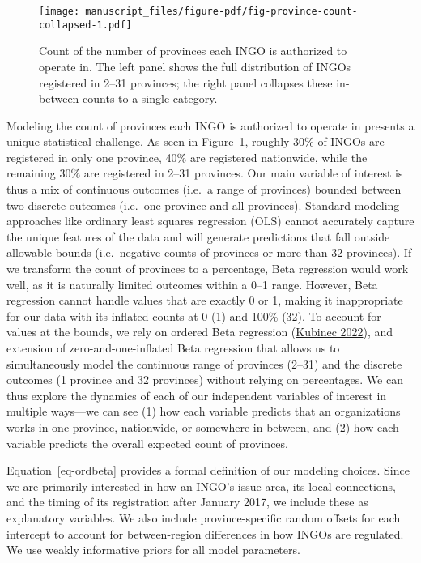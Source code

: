 \documentclass[
]{article}
\begin{document}
\begin{figure}

{\centering \texttt{[image: manuscript\_files/figure-pdf/fig-province-count-collapsed-1.pdf]}

}

\caption{\label{fig-province-count-collapsed}Count of the number of
provinces each INGO is authorized to operate in. The left panel shows
the full distribution of INGOs registered in 2--31 provinces; the right
panel collapses these in-between counts to a single category.}

\end{figure}

Modeling the count of provinces each INGO is authorized to operate in
presents a unique statistical challenge. As seen in
Figure~\ref{fig-province-count-collapsed}, roughly 30\% of INGOs are
registered in only one province, 40\% are registered nationwide, while
the remaining 30\% are registered in 2--31 provinces. Our main variable
of interest is thus a mix of continuous outcomes (i.e.~a range of
provinces) bounded between two discrete outcomes (i.e.~one province and
all provinces). Standard modeling approaches like ordinary least squares
regression (OLS) cannot accurately capture the unique features of the
data and will generate predictions that fall outside allowable bounds
(i.e.~negative counts of provinces or more than 32 provinces). If we
transform the count of provinces to a percentage, Beta regression would
work well, as it is naturally limited outcomes within a 0--1 range.
However, Beta regression cannot handle values that are exactly 0 or 1,
making it inappropriate for our data with its inflated counts at 0 (1)
and 100\% (32). To account for values at the bounds, we rely on ordered
Beta regression (\protect\hyperlink{ref-Kubinec:2022}{Kubinec 2022}),
and extension of zero-and-one-inflated Beta regression that allows us to
simultaneously model the continuous range of provinces (2--31) and the
discrete outcomes (1 province and 32 provinces) without relying on
percentages. We can thus explore the dynamics of each of our independent
variables of interest in multiple ways---we can see (1) how each
variable predicts that an organizations works in one province,
nationwide, or somewhere in between, and (2) how each variable predicts
the overall expected count of provinces.

Equation~\ref{eq-ordbeta} provides a formal definition of our modeling
choices. Since we are primarily interested in how an INGO's issue area,
its local connections, and the timing of its registration after January
2017, we include these as explanatory variables. We also include
province-specific random offsets for each intercept to account for
between-region differences in how INGOs are regulated. We use weakly
informative priors for all model parameters.
\end{document}
